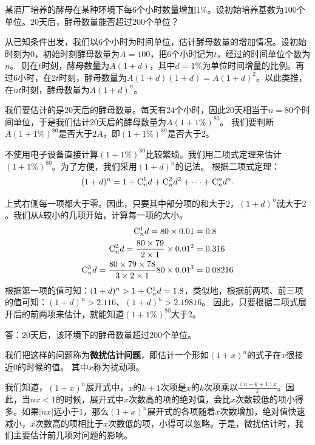\documentclass[12pt,UTF8]{ctexbook}
\begin{document}
\begin{et}
某酒厂培养的酵母在某种环境下每$6$个小时数量增加$1\%$。设初始培养基数为$100$个单位。$20$天后，酵母数量能否超过$200$个单位？
\end{et}
\begin{so}  
    从已知条件出发，我们以$6$个小时为时间单位，估计酵母数量的增加情况。设初始时刻为$0$，初始时刻酵母数量为$A = 100$，把$6$个小时记为$t$，经过的时间单位个数为$n$。
    则在$t$时刻，酵母数量为$A(1 + d)$，其中$d=1\%$为单位时间增量的比例。再过$6$小时，在$2t$时刻，酵母数量为$A(1 + d)(1 + d) = A(1 + d)^2$。以此类推，
    在$nt$时刻，酵母数量为$A(1 + d)^n$。

    我们要估计的是$20$天后的酵母数量。每天有$24$个小时，因此$20$天相当于$n=80$个时间单位，于是我们估计$20$天后的酵母数量为$A(1 + 1\%)^{80}$。
    我们要判断$A(1 + 1\%)^{80}$是否大于$2A$，即$(1 + 1\%)^{80}$是否大于$2$。

    不使用电子设备直接计算$(1 + 1\%)^{80}$比较繁琐。我们用二项式定理来估计$(1 + 1\%)^{80}$。为了方便，我们采用$(1 + d)^n$的记法。
    根据二项式定理：
    $$(1 + d)^n = 1 + \mathrm{C}_{n}^{1} d + \mathrm{C}_{n}^{2} d^2 + \cdots + \mathrm{C}_{n}^{n} d^n.$$
    
    上式右侧每一项都大于零。因此，只要其中部分项的和大于$2$，$(1 + d)^n$就大于$2$。我们从$k$较小的几项开始，计算每一项的大小。
    \begin{align*}
        \mathrm{C}_{n}^{1} d = 80 \times 0.01 &= 0.8  \\
        \mathrm{C}_{n}^{2} d = \frac{80 \times 79}{2\times 1} \times 0.01^2 &= 0.316  \\ 
        \mathrm{C}_{n}^{3} d = \frac{80 \times 79\times 78}{3\times 2\times 1}80 \times 0.01^3 &= 0.08216 
    \end{align*}
    根据第一项的值可知：$(1 + d)^n > 1 + \mathrm{C}_{n}^{1} d = 1.8$，类似地，根据前两项、前三项的值可知：$(1 + d)^n > 2.116$、$(1 + d)^n > 2.19816$。
    因此，只要根据二项式展开后的前两项来估计，就能知道$(1 + 1\%)^{80}$大于$2$。
    
    答：$20$天后，该环境下的酵母数量超过$200$个单位。
\end{so}

我们把这样的问题称为\textbf{微扰估计问题}，即估计一个形如$(1+x)^n$的式子在$x$很接近$0$的时候的值。
其中$x$称为扰动项。

我们知道，$(1+x)^n$展开式中，$x$的$k+1$次项是$x$的$k$次项乘以$\frac{(n-k+1)x}{k}$。因此，当$nx<1$的时候，展开式中$x$次数高的项的绝对值，会比$x$次数较低的项小得多。如果$|nx|$远小于$1$，那么$(1+x)^n$展开式的各项随着$x$次数增加，绝对值快速减小，$x$次数高的项相比于$x$次数低的项，小得可以忽略。于是，微扰估计时，我们主要估计前几项对问题的影响。
\end{document}
